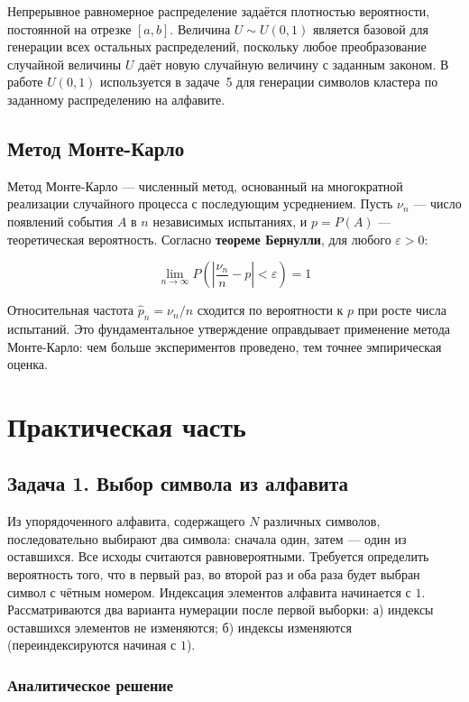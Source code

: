 \documentclass[14pt]{extarticle}
\begin{document}
Непрерывное равномерное распределение задаётся плотностью вероятности, постоянной на отрезке \([a, b]\). Величина \(U \sim U(0,1)\) является базовой для генерации всех остальных распределений, поскольку любое преобразование случайной величины \(U\) даёт новую случайную величину с заданным законом. В работе \(U(0,1)\) используется в задаче~5 для генерации символов кластера по заданному распределению на алфавите.
\subsection{Метод Монте-Карло}
\label{sec:orgfe34f4f}

Метод Монте-Карло --- численный метод, основанный на многократной реализации случайного процесса с последующим усреднением.
Пусть \(\nu_n\) --- число появлений события \(A\) в \(n\) независимых испытаниях, и \(p = P(A)\) --- теоретическая вероятность. Согласно \textbf{теореме Бернулли}, для любого \(\varepsilon > 0\):

$$\lim_{n \to \infty} P\!\left( \left| \frac{\nu_n}{n} - p \right| < \varepsilon \right) = 1$$

Относительная частота \(\hat{p}_n = \nu_n / n\) сходится по вероятности к \(p\) при росте числа испытаний. Это фундаментальное утверждение оправдывает применение метода Монте-Карло: чем больше экспериментов проведено, тем точнее эмпирическая оценка.

\clearpage
\section{Практическая часть}
\label{sec:org0cd9751}

\subsection{Задача 1. Выбор символа из алфавита}
\label{sec:org750d5d2}

Из упорядоченного алфавита, содержащего \(N\) различных символов, последовательно выбирают два символа: сначала один, затем --- один из оставшихся. Все исходы считаются равновероятными. Требуется определить вероятность того, что в первый раз, во второй раз и оба раза будет выбран символ с чётным номером. Индексация элементов алфавита начинается с \(1\). Рассматриваются два варианта нумерации после первой выборки: а) индексы оставшихся элементов не изменяются; б) индексы изменяются (переиндексируются начиная с \(1\)).
\subsubsection{Аналитическое решение}
\label{sec:org08864cf}
\end{document}
